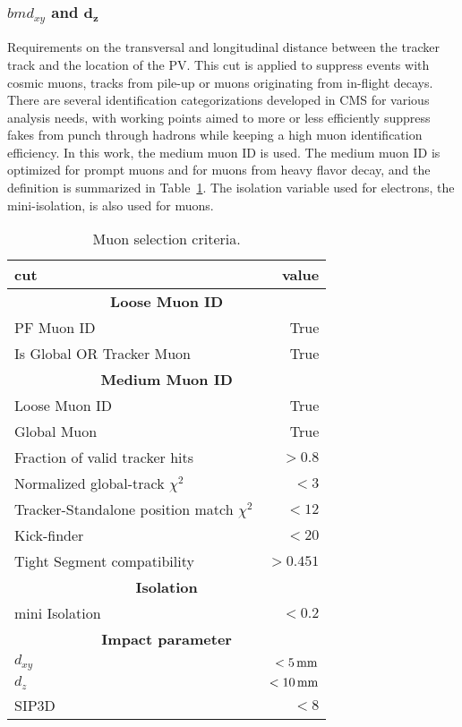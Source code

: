 \subsubsection*{$bm{d_{xy}}$ and $\bm{d_{z}}$}
\noindent\justify
Requirements on the transversal and longitudinal distance between the tracker track and the location of the PV. 
This cut is applied to suppress events with cosmic muons, tracks from pile-up or muons originating from in-flight decays.
\newpara
\noindent\justify  
There are several identification categorizations developed in CMS for various analysis needs, with working points aimed to more or less efficiently suppress fakes from punch through hadrons while keeping a high muon identification efficiency.
In this work, the medium muon ID is used. The medium muon ID is optimized for prompt muons and for muons from heavy flavor decay, and the definition is summarized in Table~\ref{tab:muonsID}. 
The isolation variable used for electrons, the mini-isolation, is also used for muons. 
\begin{table}[ht!]
\def\arraystretch{1.2}
    \caption{Muon selection criteria.}
    \label{tab:muonsID}
    \begin{center}
        \begin{tabular}{ l r}
        \hline \hline
        cut         &  value                             \\ \hline
        \multicolumn{2}{c}{\textbf{Loose Muon ID}}                \\
             PF Muon ID                        &  True \\
             Is Global OR Tracker Muon                        &  True \\
        \multicolumn{2}{c}{\textbf{Medium Muon ID}}                \\
             Loose Muon ID                        &  True \\
             Global Muon                         &  True \\
             Fraction of valid tracker hits      &  $>0.8$ \\
             Normalized global-track $\chi^{2}$     &  $<3$ \\
             Tracker-Standalone position match $\chi^{2}$   &  $<12$ \\
             Kick-finder    &   $<20$\\
             Tight Segment compatibility  & $>0.451$\\
        \multicolumn{2}{c}{\textbf{Isolation}}                \\
             mini Isolation                 &   $<0.2$                         \\
        \multicolumn{2}{c}{\textbf{Impact parameter}}                \\
        $d_{xy}$ & $<5\,\text{mm}$ \\
        $d_{z} $ & $<10\,\text{mm}$ \\
        SIP3D    & $< 8$ \\
\hline\hline
\end{tabular}
\end{center}
\end{table}                                                                                                      
